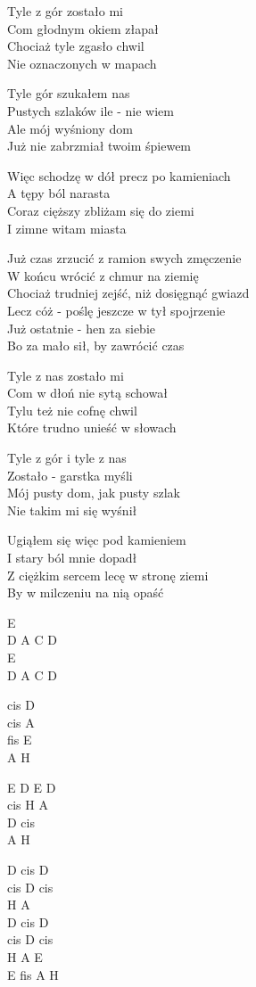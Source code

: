 \begin{text}
Tyle z gór zostało mi\\
Com głodnym okiem złapał\\
Chociaż tyle zgasło chwil\\
Nie oznaczonych w mapach

Tyle gór szukałem nas\\
Pustych szlaków ile - nie wiem\\
Ale mój wyśniony dom\\
Już nie zabrzmiał twoim śpiewem

Więc schodzę w dół precz po kamieniach\\
A tępy ból narasta\\
Coraz cięższy zbliżam się do ziemi\\
I zimne witam miasta

Już czas zrzucić z ramion swych zmęczenie\\
W końcu wrócić z chmur na ziemię\\
Chociaż trudniej zejść, niż dosięgnąć gwiazd\\
Lecz cóż - poślę jeszcze w tył spojrzenie\\
Już ostatnie - hen za siebie\\
Bo za mało sił, by zawrócić czas

Tyle z nas zostało mi\\
Com w dłoń nie sytą schował\\
Tylu też nie cofnę chwil\\
Które trudno unieść w słowach

Tyle z gór i tyle z nas\\
Zostało - garstka myśli\\
Mój pusty dom, jak pusty szlak\\
Nie takim mi się wyśnił

Ugiąłem się więc pod kamieniem\\
I stary ból mnie dopadł\\
Z ciężkim sercem lecę w stronę ziemi\\
By w milczeniu na nią opaść
\end{text}
\begin{chord}
    E\\
    D A C D\\
    E\\
    D A C D

    cis D\\
    cis A\\
    fis E\\
    A H

    E D E D\\
    cis H A\\
    D cis\\
    A H

    D cis D\\
    cis D cis\\
    H A\\
    D cis D\\
    cis D cis\\
    H A E\\
    E fis A H
\end{chord}